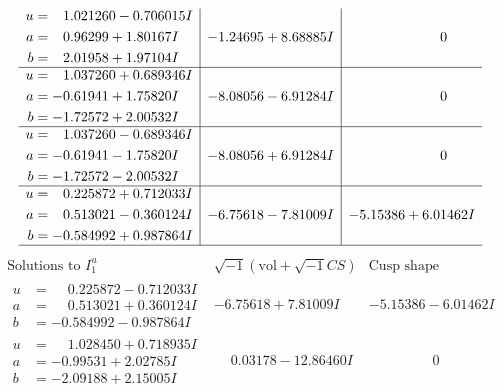 \documentclass[1p]{elsarticle_modified}
\theoremstyle{definition}
\newcommand{\I}{\sqrt{-1}}
\begin{document}
$$\begin{array}{c|c|c}
\begin{aligned}
u &= \phantom{-}1.021260 - 0.706015 I \\
a &= \phantom{-}0.96299 + 1.80167 I \\
b &= \phantom{-}2.01958 + 1.97104 I\end{aligned}
 & -1.24695 + 8.68885 I & \phantom{-0.000000 } 0 \\ \hline\begin{aligned}
u &= \phantom{-}1.037260 + 0.689346 I \\
a &= -0.61941 + 1.75820 I \\
b &= -1.72572 + 2.00532 I\end{aligned}
 & -8.08056 - 6.91284 I & \phantom{-0.000000 } 0 \\ \hline\begin{aligned}
u &= \phantom{-}1.037260 - 0.689346 I \\
a &= -0.61941 - 1.75820 I \\
b &= -1.72572 - 2.00532 I\end{aligned}
 & -8.08056 + 6.91284 I & \phantom{-0.000000 } 0 \\ \hline\begin{aligned}
u &= \phantom{-}0.225872 + 0.712033 I \\
a &= \phantom{-}0.513021 - 0.360124 I \\
b &= -0.584992 + 0.987864 I\end{aligned}
 & -6.75618 - 7.81009 I & -5.15386 + 6.01462 I\\
 \hline 
 \end{array}$$\newpage$$\begin{array}{c|c|c}  
\text{Solutions to }I^u_{1}& \I (\text{vol} + \sqrt{-1}CS) & \text{Cusp shape}\\
 \hline 
\begin{aligned}
u &= \phantom{-}0.225872 - 0.712033 I \\
a &= \phantom{-}0.513021 + 0.360124 I \\
b &= -0.584992 - 0.987864 I\end{aligned}
 & -6.75618 + 7.81009 I & -5.15386 - 6.01462 I \\ \hline\begin{aligned}
u &= \phantom{-}1.028450 + 0.718935 I \\
a &= -0.99531 + 2.02785 I \\
b &= -2.09188 + 2.15005 I\end{aligned}
 & \phantom{-}0.03178 - 12.86460 I & \phantom{-0.000000 } 0 \\ \hline\begin{aligned}

\end{aligned}
\end{array}$$
\end{document}
